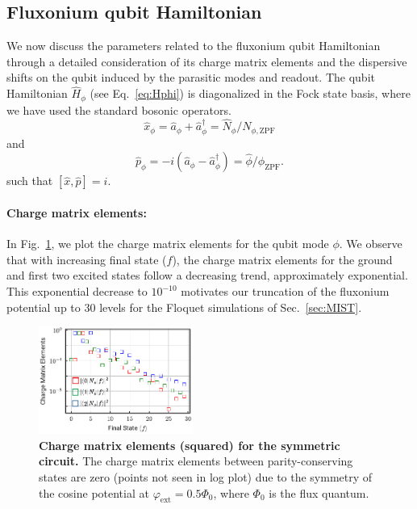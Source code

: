 \documentclass[%
reprint,
superscriptaddress,
 amsmath,amssymb,
 aps,
 prx,
longbibliography,
floatfix,
]{revtex4-2}
\begin{document}
\subsection{Fluxonium qubit Hamiltonian}
We now discuss the parameters related to the fluxonium qubit Hamiltonian through a detailed consideration of its charge matrix elements and the dispersive shifts on the qubit induced by the parasitic modes and readout. The qubit Hamiltonian $\hat H_{\phi}$ (see Eq.~\ref{eq:Hphi}) is diagonalized in the Fock state basis, where we have used the standard bosonic operators.
 \begin{equation} \hat x_\phi=\hat a_\phi+\hat a_\phi^\dagger=\hat N_{\phi}/ N_{\phi,\mathrm{ZPF}}
 \end{equation}
 and 
 \begin{equation} \hat p_\phi=-i(\hat a_\phi-\hat a_\phi^\dagger)=\hat \phi/\phi_{\mathrm{ZPF}}.
 \end{equation}
such that $[\hat x,\hat p]=i$.
\paragraph{Charge matrix elements:}
In Fig.~\ref{charge-matrix}, we plot the charge matrix elements for the qubit mode $\phi$. We observe that with increasing final state ($f$), the charge matrix elements for the ground and first two excited states follow a decreasing trend, approximately exponential. This exponential decrease to $10^{-10}$ motivates our truncation of the fluxonium potential up to $30$ levels for the Floquet simulations of Sec.~\ref{sec:MIST}.
\begin{figure}[t]
    \centering
\includegraphics[width=0.45\textwidth]{Supp_Fig/Charge_Matrix.pdf}
    \caption{{\bf Charge matrix elements (squared) for the symmetric circuit.} The charge matrix elements between parity-conserving states are zero (points not seen in log plot) due to the symmetry of the cosine potential at $\varphi_\mathrm{ext}=0.5\Phi_0$, where $\Phi_0$ is the flux quantum.}
    \label{charge-matrix}
\end{figure}
\end{document}
